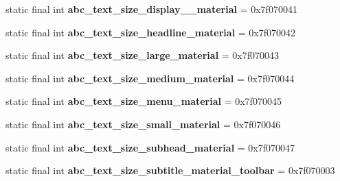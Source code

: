 \begin{DoxyCompactItemize}
\item 
\hypertarget{classandroid_1_1support_1_1design_1_1_r_1_1dimen_a8e55855f262f4e761dd55609d351e8af}{}static final int {\bfseries abc\+\_\+text\+\_\+size\+\_\+display\+\_\+\_\+material} = 0x7f070041\label{classandroid_1_1support_1_1design_1_1_r_1_1dimen_a8e55855f262f4e761dd55609d351e8af}

\item 
\hypertarget{classandroid_1_1support_1_1design_1_1_r_1_1dimen_a2081000949435fecb9964aa41ab05907}{}static final int {\bfseries abc\+\_\+text\+\_\+size\+\_\+headline\+\_\+material} = 0x7f070042\label{classandroid_1_1support_1_1design_1_1_r_1_1dimen_a2081000949435fecb9964aa41ab05907}

\item 
\hypertarget{classandroid_1_1support_1_1design_1_1_r_1_1dimen_af1d4e99b6a3ce4f2fb3ba72c6b953412}{}static final int {\bfseries abc\+\_\+text\+\_\+size\+\_\+large\+\_\+material} = 0x7f070043\label{classandroid_1_1support_1_1design_1_1_r_1_1dimen_af1d4e99b6a3ce4f2fb3ba72c6b953412}

\item 
\hypertarget{classandroid_1_1support_1_1design_1_1_r_1_1dimen_a6479afaabebd9416c3403c54b0f5bd59}{}static final int {\bfseries abc\+\_\+text\+\_\+size\+\_\+medium\+\_\+material} = 0x7f070044\label{classandroid_1_1support_1_1design_1_1_r_1_1dimen_a6479afaabebd9416c3403c54b0f5bd59}

\item 
\hypertarget{classandroid_1_1support_1_1design_1_1_r_1_1dimen_a03965514ad78473ff07b5eba8191081b}{}static final int {\bfseries abc\+\_\+text\+\_\+size\+\_\+menu\+\_\+material} = 0x7f070045\label{classandroid_1_1support_1_1design_1_1_r_1_1dimen_a03965514ad78473ff07b5eba8191081b}

\item 
\hypertarget{classandroid_1_1support_1_1design_1_1_r_1_1dimen_a8a4fb3e596b4b3a400c7623b71bf5ff3}{}static final int {\bfseries abc\+\_\+text\+\_\+size\+\_\+small\+\_\+material} = 0x7f070046\label{classandroid_1_1support_1_1design_1_1_r_1_1dimen_a8a4fb3e596b4b3a400c7623b71bf5ff3}

\item 
\hypertarget{classandroid_1_1support_1_1design_1_1_r_1_1dimen_aebb837455075fb116b55f1e630d32dd5}{}static final int {\bfseries abc\+\_\+text\+\_\+size\+\_\+subhead\+\_\+material} = 0x7f070047\label{classandroid_1_1support_1_1design_1_1_r_1_1dimen_aebb837455075fb116b55f1e630d32dd5}

\item 
\hypertarget{classandroid_1_1support_1_1design_1_1_r_1_1dimen_a2c3b879fdd2573d992fedf97f0e2295b}{}static final int {\bfseries abc\+\_\+text\+\_\+size\+\_\+subtitle\+\_\+material\+\_\+toolbar} = 0x7f070003\label{classandroid_1_1support_1_1design_1_1_r_1_1dimen_a2c3b879fdd2573d992fedf97f0e2295b}


\end{DoxyCompactItemize}
